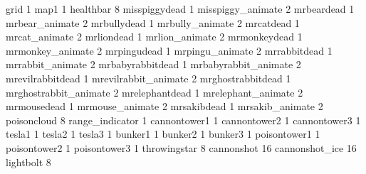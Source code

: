 grid 1
map1 1
healthbar 8
misspiggydead 1
misspiggy_animate 2
mrbeardead 1
mrbear_animate 2
mrbullydead 1
mrbully_animate 2
mrcatdead 1
mrcat_animate 2
mrliondead 1
mrlion_animate 2
mrmonkeydead 1
mrmonkey_animate 2
mrpingudead 1
mrpingu_animate 2
mrrabbitdead 1
mrrabbit_animate 2
mrbabyrabbitdead 1
mrbabyrabbit_animate 2
mrevilrabbitdead 1
mrevilrabbit_animate 2
mrghostrabbitdead 1
mrghostrabbit_animate 2
mrelephantdead 1
mrelephant_animate 2
mrmousedead 1
mrmouse_animate 2
mrsakibdead 1
mrsakib_animate 2
poisoncloud 8
range_indicator 1
cannontower1 1
cannontower2 1
cannontower3 1
tesla1 1
tesla2 1
tesla3 1
bunker1 1
bunker2 1
bunker3 1
poisontower1 1
poisontower2 1
poisontower3 1
throwingstar 8
cannonshot 16
cannonshot_ice 16
lightbolt 8
